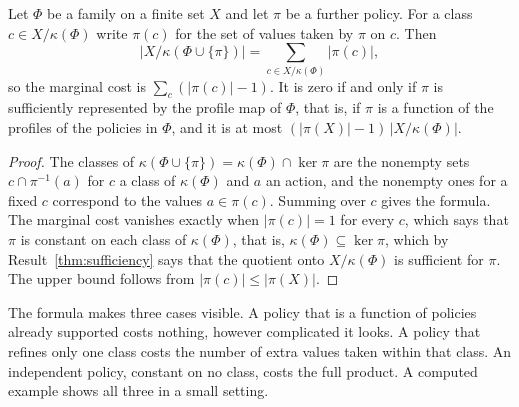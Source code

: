 \begin{newresult}\label{prop:marginal-policy}
Let $\Phi$ be a family on a finite set $X$ and let $\pi$ be a further policy. For a class $c\in X/\kappa(\Phi)$ write $\pi(c)$ for the set of values taken by $\pi$ on $c$. Then
\[
|X/\kappa(\Phi\cup\{\pi\})|=\sum_{c\in X/\kappa(\Phi)}|\pi(c)|,
\]
so the marginal cost is $\sum_c(|\pi(c)|-1)$. It is zero if and only if $\pi$ is sufficiently represented by the profile map of $\Phi$, that is, if $\pi$ is a function of the profiles of the policies in $\Phi$, and it is at most $(|\pi(X)|-1)\,|X/\kappa(\Phi)|$.
\end{newresult}
\begin{proof}
The classes of $\kappa(\Phi\cup\{\pi\})=\kappa(\Phi)\cap\ker\pi$ are the nonempty sets $c\cap\pi^{-1}(a)$ for $c$ a class of $\kappa(\Phi)$ and $a$ an action, and the nonempty ones for a fixed $c$ correspond to the values $a\in\pi(c)$. Summing over $c$ gives the formula. The marginal cost vanishes exactly when $|\pi(c)|=1$ for every $c$, which says that $\pi$ is constant on each class of $\kappa(\Phi)$, that is, $\kappa(\Phi)\subseteq\ker\pi$, which by Result~\ref{thm:sufficiency} says that the quotient onto $X/\kappa(\Phi)$ is sufficient for $\pi$. The upper bound follows from $|\pi(c)|\le|\pi(X)|$.
\end{proof}

The formula makes three cases visible. A policy that is a function of policies already supported costs nothing, however complicated it looks. A policy that refines only one class costs the number of extra values taken within that class. An independent policy, constant on no class, costs the full product. A computed example shows all three in a small setting.

